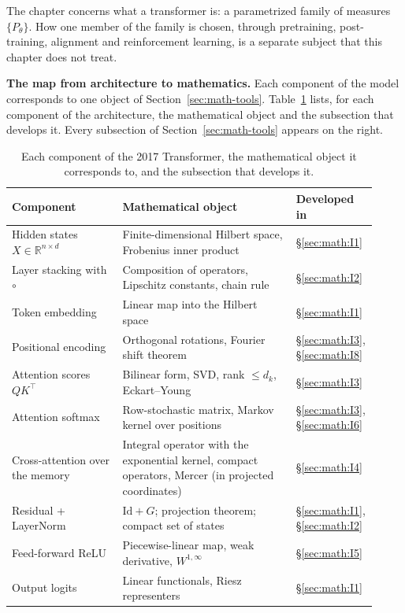 The chapter concerns what a transformer is: a parametrized family of
measures \(\{P_\theta\}\). How one member of the family is chosen, through
pretraining, post-training, alignment and reinforcement learning, is a
separate subject that this chapter does not treat.

\textbf{The map from architecture to mathematics.} Each component of the
model corresponds to one object of Section~\ref{sec:math-tools}. Table~\ref{tab:math-map} lists, for each
component of the architecture, the mathematical object and the
subsection that develops it. Every subsection of Section~\ref{sec:math-tools} appears on the right.

\begin{longtable}{@{}p{0.30\linewidth}p{0.47\linewidth}p{0.15\linewidth}@{}}
\caption{Each component of the 2017 Transformer, the mathematical object it corresponds to, and the subsection that develops it.}\label{tab:math-map}\\
\toprule
Component & Mathematical object & Developed in \\
\midrule
\endhead
Hidden states \(X\in\mathbb{R}^{n\times d}\) & Finite-dimensional Hilbert space, Frobenius inner product & \S\ref{sec:math:I1} \\
Layer stacking with \(\circ\) & Composition of operators, Lipschitz constants, chain rule & \S\ref{sec:math:I2} \\
Token embedding & Linear map into the Hilbert space & \S\ref{sec:math:I1} \\
Positional encoding & Orthogonal rotations, Fourier shift theorem & \S\ref{sec:math:I3}, \S\ref{sec:math:I8} \\
Attention scores \(QK^{\top}\) & Bilinear form, SVD, rank \(\le d_k\), Eckart--Young & \S\ref{sec:math:I3} \\
Attention softmax & Row-stochastic matrix, Markov kernel over positions & \S\ref{sec:math:I3}, \S\ref{sec:math:I6} \\
Cross-attention over the memory & Integral operator with the exponential kernel, compact operators, Mercer (in projected coordinates) & \S\ref{sec:math:I4} \\
Residual + LayerNorm & \(\mathrm{Id}+G\); projection theorem; compact set of states & \S\ref{sec:math:I1}, \S\ref{sec:math:I2} \\
Feed-forward ReLU & Piecewise-linear map, weak derivative, \(W^{1,\infty}\) & \S\ref{sec:math:I5} \\
Output logits & Linear functionals, Riesz representers & \S\ref{sec:math:I1} \\

\end{longtable}
